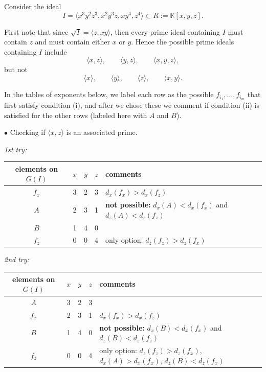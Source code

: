 \documentclass[11pt]{amsart}   %
\begin{document}
\begin{exm}\label{exm_assoc}
Consider the ideal $$I=\langle x^3y^2z^3, x^2y^3z, xy^4, z^4\rangle\subset R:=\mathbb K[x,y,z].$$

First note that since $\sqrt{I}=\langle z,xy\rangle$, then every prime ideal containing $I$ must contain $z$ and must contain either $x$ or $y$. Hence the possible prime ideals containing $I$ include
\[
\langle x,z\rangle,\qquad
\langle y,z\rangle,\qquad
\langle x,y,z\rangle,
\]
but not
\[
\langle x\rangle,\qquad
\langle y\rangle,\qquad
\langle z\rangle,\qquad
\langle x,y\rangle.
\]

In the tables of exponents below, we label each row as the possible $f_{i_1},\ldots,f_{i_m}$ that first satisfy condition (i), and after we chose these we comment if condition (ii) is satisfied for the other rows (labeled here with $A$ and $B$).

\medskip

\noindent $\bullet$ Checking if $\langle x,z\rangle$ is an associated prime.

\medskip

{\em 1st try:}

\medskip

\begin{tabular}{c|c|c|c|l}
elements on $G(I)$ & $x$ & $y$ & $z$ & comments\\\hline
$f_x$ & 3 & 2 & 3 & $d_x(f_x)>d_x(f_z)$\\\hline
$A$ & 2 & 3 & 1 & {\bf not possible:} $d_x(A)<d_x(f_x)$ and $d_z(A)<d_z(f_z)$\\\hline
$B$ & 1 & 4 & 0 & \\\hline
$f_z$ & 0 & 0 & 4& only option: $d_z(f_z)>d_z(f_x)$    
\end{tabular}

\medskip

{\em 2nd try:}

\medskip

\begin{tabular}{c|c|c|c|l}
elements on $G(I)$ & $x$ & $y$ & $z$ & comments\\\hline
$A$ & 3 & 2 & 3 & \\\hline
$f_x$ & 2 & 3 & 1 & $d_x(f_x)>d_x(f_z)$\\\hline
$B$ & 1 & 4 & 0 & {\bf not possible:} $d_x(B)<d_x(f_x)$ and $d_z(B)<d_z(f_z)$\\\hline
$f_z$ & 0 & 0 & 4& \shortstack[l]{ only option: $d_z(f_z)>d_z(f_x)$, $d_x(A)>d_x(f_x)$,\\ $d_z(B)<d_z(f_x)$ }
\end{tabular}


\end{exm}
\end{document}
